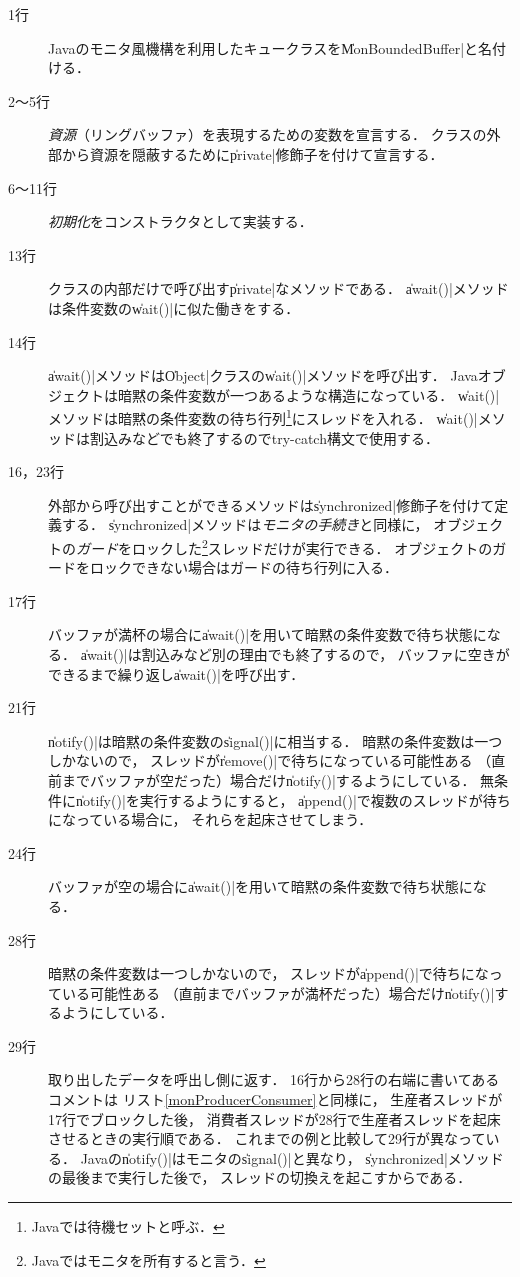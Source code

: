 \begin{description}
\item [1行]
  Javaのモニタ風機構を利用したキュークラスを\|MonBoundedBuffer|と名付ける．
\item [2〜5行]
  \emph{資源}（リングバッファ）を表現するための変数を宣言する．
  クラスの外部から資源を隠蔽するために\|private|修飾子を付けて宣言する．
\item [6〜11行]
  \emph{初期化}をコンストラクタとして実装する．
\item [13行]
  クラスの内部だけで呼び出す\|private|なメソッドである．
  \|await()|メソッドは条件変数の\|wait()|に似た働きをする．
\item [14行]
  \|await()|メソッドは\|Object|クラスの\|wait()|メソッドを呼び出す．
  Javaオブジェクトは暗黙の条件変数が一つあるような構造になっている．
  \|wait()|メソッドは暗黙の条件変数の待ち行列\footnote{
    Javaでは待機セットと呼ぶ．}にスレッドを入れる．
  \|wait()|メソッドは割込みなどでも終了するのでtry-catch構文で使用する．
\item [16，23行]
  外部から呼び出すことができるメソッドは\|synchronized|修飾子を付けて定義する．
  \|synchronized|メソッドは\emph{モニタの手続き}と同様に，
  オブジェクトの\emph{ガード}をロックした\footnote{
    Javaではモニタを所有すると言う．}スレッドだけが実行できる．
  オブジェクトのガードをロックできない場合はガードの待ち行列に入る．
\item [17行]
  バッファが満杯の場合に\|await()|を用いて暗黙の条件変数で待ち状態になる．
  \|await()|は割込みなど別の理由でも終了するので，
  バッファに空きができるまで繰り返し\|await()|を呼び出す．
\item [21行]
  \|notify()|は暗黙の条件変数の\|signal()|に相当する．
  暗黙の条件変数は一つしかないので，
  スレッドが\|remove()|で待ちになっている可能性ある
  （直前までバッファが空だった）場合だけ\|notify()|するようにしている．
  無条件に\|notify()|を実行するようにすると，
  \|append()|で複数のスレッドが待ちになっている場合に，
  それらを起床させてしまう．
\item [24行]
  バッファが空の場合に\|await()|を用いて暗黙の条件変数で待ち状態になる．
\item [28行]
  暗黙の条件変数は一つしかないので，
  スレッドが\|append()|で待ちになっている可能性ある
  （直前までバッファが満杯だった）場合だけ\|notify()|するようにしている．
\item [29行]
  取り出したデータを呼出し側に返す．
  16行から28行の右端に書いてあるコメントは
  リスト\ref{monProducerConsumer}と同様に，
  生産者スレッドが17行でブロックした後，
  消費者スレッドが28行で生産者スレッドを起床させるときの実行順である．
  これまでの例と比較して29行が異なっている．
  Javaの\|notify()|はモニタの\|signal()|と異なり，
  \|synchronized|メソッドの最後まで実行した後で，
  スレッドの切換えを起こすからである．
\end{description}

